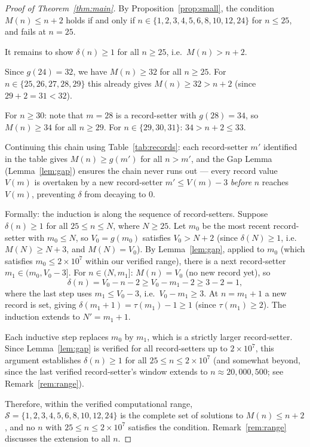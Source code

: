 \documentclass[12pt]{article}
\theoremstyle{plain}
\theoremstyle{definition}
\begin{document}
\begin{proof}[Proof of Theorem~\ref{thm:main}]
By Proposition~\ref{prop:small}, the condition $M(n) \leq n+2$ holds if and only if
$n \in \{1,2,3,4,5,6,8,10,12,24\}$ for $n \leq 25$, and fails at $n = 25$.

It remains to show $\delta(n) \geq 1$ for all $n \geq 25$, i.e.\ $M(n) > n + 2$.

Since $g(24) = 32$, we have $M(n) \geq 32$ for all $n \geq 25$.  For $n \in \{25, 26, 27, 28, 29\}$
this already gives $M(n) \geq 32 > n + 2$ (since $29 + 2 = 31 < 32$).

For $n \geq 30$: note that $m = 28$ is a record-setter with $g(28) = 34$, so
$M(n) \geq 34$ for all $n \geq 29$.  For $n \in \{29, 30, 31\}$: $34 > n + 2 \leq 33$.
\checkmark

Continuing this chain using Table~\ref{tab:records}: each record-setter $m'$ identified
in the table gives $M(n) \geq g(m')$ for all $n > m'$, and the Gap Lemma
(Lemma~\ref{lem:gap}) ensures the chain never runs out --- every record value $V(m)$
is overtaken by a new record-setter $m' \leq V(m) - 3$ \emph{before} $n$ reaches
$V(m)$, preventing $\delta$ from decaying to 0.

Formally: the induction is along the sequence of record-setters.
Suppose $\delta(n) \geq 1$ for all $25 \leq n \leq N$, where $N \geq 25$.
Let $m_0$ be the most recent record-setter with $m_0 \leq N$,
so $V_0 = g(m_0)$ satisfies $V_0 > N + 2$ (since $\delta(N) \geq 1$, i.e.\ $M(N) \geq N+3$,
and $M(N) = V_0$).
By Lemma~\ref{lem:gap}, applied to $m_0$ (which satisfies $m_0 \leq 2\times 10^7$ within our
verified range), there is a next record-setter $m_1 \in (m_0, V_0 - 3]$.
For $n \in (N, m_1]$: $M(n) = V_0$ (no new record yet), so
\[
  \delta(n) = V_0 - n - 2 \geq V_0 - m_1 - 2 \geq 3 - 2 = 1,
\]
where the last step uses $m_1 \leq V_0 - 3$, i.e.\ $V_0 - m_1 \geq 3$.
At $n = m_1 + 1$ a new record is set, giving $\delta(m_1+1) = \tau(m_1) - 1 \geq 1$
(since $\tau(m_1) \geq 2$).  The induction extends to $N' = m_1 + 1$.

Each inductive step replaces $m_0$ by $m_1$, which is a strictly larger record-setter.
Since Lemma~\ref{lem:gap} is verified for all record-setters up to $2\times 10^7$,
this argument establishes $\delta(n) \geq 1$ for all $25 \leq n \leq 2\times 10^7$
(and somewhat beyond, since the last verified record-setter's window extends to $n \approx 20{,}000{,}500$; see Remark~\ref{rem:range}).

Therefore, within the verified computational range,
$\mathcal{S} = \{1, 2, 3, 4, 5, 6, 8, 10, 12, 24\}$ is the complete set of
solutions to $M(n) \leq n+2$, and no $n$ with $25 \leq n \leq 2\times 10^7$
satisfies the condition.  Remark~\ref{rem:range} discusses the extension to
all $n$.
\end{proof}
\end{document}
